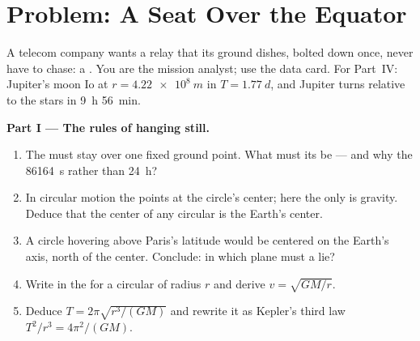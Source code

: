 \section{Problem: A Seat Over the Equator}

\begin{problem}
\label{pb:g12:satellites-kepler:1}
A telecom company wants a relay that its ground dishes, bolted down
once, never have to chase: a  . You are the
mission analyst; use the data card. For Part~IV: Jupiter's moon Io
 at $r = \qty{4.22e8}{m}$ in $T = \qty{1.77}{d}$, and Jupiter
turns relative to the stars in \qty{9}{h} \qty{56}{min}.

\medskip
\noindent\textbf{Part I --- The rules of hanging still.}
\begin{enumerate}
  \item The  must stay over one fixed ground point. What
        must its  be --- and why the 
        \qty{86164}{s} rather than \qty{24}{h}?
  \item In circular motion the  points at the circle's
        center; here the only  is gravity. Deduce that the
        center of any circular  is the Earth's center.
  \item A circle hovering above Paris's latitude would be centered
        on the Earth's axis, north of the center. Conclude: in which
        plane must a  lie?
  \item Write  in the  for a circular
         of radius $r$ and derive $v = \sqrt{GM/r}$.
  \item Deduce $T = 2\pi\sqrt{r^3/(GM)}$ and rewrite it as Kepler's
        third law $T^2/r^3 = 4\pi^2/(GM)$.
\end{enumerate}


\end{problem}
